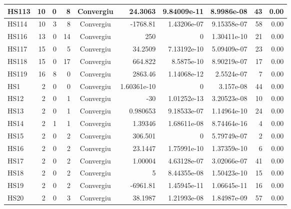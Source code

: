 \begin{center}
\begin{longtable}{|l|r|r|r|c|r|r|r|r|r|}
   HS113 &     10 &      0 &      8 & Convergiu  &     24.3063 &    9.84009e-11 &  8.9986e-08 &     43 &    0.00 \\ \hline
   HS114 &     10 &      3 &      8 & Convergiu  &    -1768.81 &    1.43206e-07 & 9.15358e-07 &     58 &    0.00 \\ \hline
   HS116 &     13 &      0 &     14 & Convergiu  &         250 &              0 & 1.30411e-10 &     21 &    0.00 \\ \hline
   HS117 &     15 &      0 &      5 & Convergiu  &     34.2509 &    7.13192e-10 & 5.09409e-07 &     23 &    0.00 \\ \hline
   HS118 &     15 &      0 &     17 & Convergiu  &     664.822 &     8.5875e-10 & 8.90219e-07 &     17 &    0.00 \\ \hline
   HS119 &     16 &      8 &      0 & Convergiu  &     2863.46 &    1.14068e-12 &  2.5524e-07 &      7 &    0.00 \\ \hline
     HS1 &      2 &      0 &      0 & Convergiu  & 1.60361e-10 &              0 &   3.157e-08 &     44 &    0.00 \\ \hline
    HS12 &      2 &      0 &      1 & Convergiu  &         -30 &    1.01252e-13 & 3.20523e-08 &     10 &    0.00 \\ \hline
    HS13 &      2 &      0 &      1 & Convergiu  &    0.980653 &    9.18533e-07 & 1.14964e-10 &     24 &    0.00 \\ \hline
    HS14 &      2 &      1 &      1 & Convergiu  &     1.39346 &    1.68611e-08 & 8.74464e-16 &      4 &    0.00 \\ \hline
    HS15 &      2 &      0 &      2 & Convergiu  &     306.501 &              0 & 5.79749e-07 &      2 &    0.00 \\ \hline
    HS16 &      2 &      0 &      2 & Convergiu  &     23.1447 &    1.75991e-10 & 1.37359e-10 &      6 &    0.00 \\ \hline
    HS17 &      2 &      0 &      2 & Convergiu  &     1.00004 &    4.63128e-07 & 3.02066e-07 &     41 &    0.00 \\ \hline
    HS18 &      2 &      0 &      2 & Convergiu  &           5 &    8.44355e-08 & 1.50423e-10 &     15 &    0.00 \\ \hline
    HS19 &      2 &      0 &      2 & Convergiu  &    -6961.81 &    1.45945e-11 & 1.06645e-11 &     16 &    0.00 \\ \hline
    HS20 &      2 &      0 &      3 & Convergiu  &     38.1987 &    1.21993e-08 & 1.84987e-09 &     57 &    0.00 \\ \hline

\end{longtable}
\end{center}
